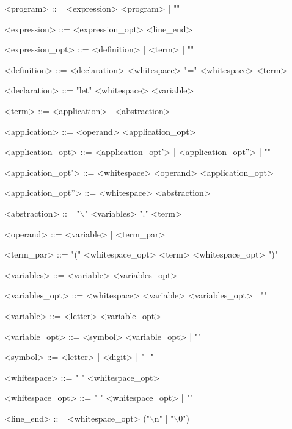 \documentclass[12pt]{article}
\begin{document}
<program> ::= <expression> <program> | ""

<expression> ::= <expression\_opt> <line\_end>

<expression\_opt> ::= <definition> | <term> | ""

<definition> ::= <declaration> <whitespace> "=" <whitespace> <term>

<declaration> ::= "let" <whitespace> <variable>

<term> ::= <application> | <abstraction>

<application> ::= <operand> <application\_opt>

<application\_opt> ::= <application\_opt'> | <application\_opt''> | ""

<application\_opt'> ::= <whitespace> <operand> <application\_opt>

<application\_opt''> ::= <whitespace> <abstraction>

<abstraction> ::= "$\backslash$" <variables> "." <term>

<operand> ::= <variable> | <term\_par>

<term\_par> ::= "(" <whitespace\_opt> <term> <whitespace\_opt> ")"

<variables> ::= <variable> <variables\_opt>

<variables\_opt> ::= <whitespace> <variable> <variables\_opt> | ""

<variable> ::= <letter> <variable\_opt>

<variable\_opt> ::= <symbol> <variable\_opt> | ""

<symbol> ::= <letter> | <digit> | "\_"

<whitespace> ::= " " <whitespace\_opt>

<whitespace\_opt> ::= " " <whitespace\_opt> | ""

<line\_end> ::= <whitespace\_opt> ("$\backslash$n" | "$\backslash$0")
\end{document}
